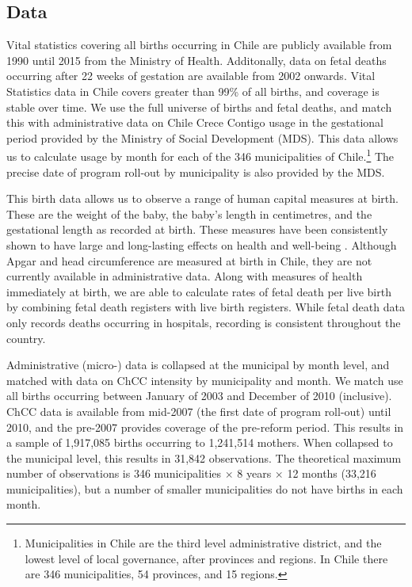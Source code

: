 \documentclass[12pt]{article}
\begin{document}
\begin{spacing}{1.4}
\section{Data}
\label{scn:data}
Vital statistics covering all births occurring in Chile are
publicly available from 1990 until 2015 from the Ministry of
Health. Additonally, data on fetal deaths occurring after 22
weeks of gestation are available from 2002 onwards. Vital
Statistics data in Chile covers greater than 99\% of all births,
and coverage is stable over time.  We use the full universe of
births and fetal deaths, and match this with administrative data
on Chile Crece Contigo usage in the gestational period provided
by the Ministry of Social Development (MDS).  This data allows us
to calculate usage by month for each of the 346 municipalities of
Chile.\footnote{Municipalities in Chile are the third level
  administrative district, and the lowest level of local
  governance, after provinces and regions.  In Chile there are
  346 municipalities, 54 provinces, and 15 regions.}  The precise
date of program roll-out by municipality is also provided by the
MDS.

This birth data allows us to observe a range of human capital measures
at birth.  These are the weight of the baby, the baby's length
in centimetres, and the gestational length as recorded at birth. These
measures have been consistently shown to have large and long-lasting
effects on health and well-being \citep{AlmondCurrie2011b}.
Although Apgar and head circumference are measured at birth in
Chile, they are not currently available in administrative data.
Along with measures of health immediately at birth, we are able
to calculate rates of fetal death per live birth by combining
fetal death registers with live birth registers.  While fetal death
data only records deaths occurring in hospitals, recording is
consistent throughout the country.

Administrative (micro-) data is collapsed at the municipal by
month level, and matched with data on ChCC intensity by municipality
and month.  We match use all births occurring between January of 2003
and December of 2010 (inclusive).  ChCC data is available from
mid-2007 (the first date of program roll-out) until 2010, and the
pre-2007 provides coverage of the pre-reform period.  This results in
a sample of 1,917,085 births occurring to 1,241,514 mothers. When
collapsed to the municipal level, this results in 31,842 observations.
The theoretical maximum number of observations is 346 municipalities
$\times$ 8 years $\times$ 12 months (33,216 municipalities), but a
number of smaller municipalities do not have births in each month.


\end{spacing}
\end{document}
